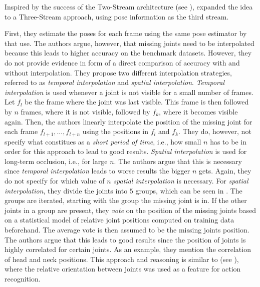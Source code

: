 Inspired by the success of the Two-Stream architecture (see ), \cite{khalid_multi-modal_2018} expanded the idea to a Three-Stream approach, using pose information as the third stream.

First, they estimate the poses for each frame using the same pose estimator by \cite{cao_realtime_2017} that \cite{choutas_potion:_2018} use.
The authors argue, however, that missing joints need to be interpolated because this leads to higher accuracy on the benchmark datasets.
However, they do not provide evidence in form of a direct comparison of accuracy with and without interpolation.
They propose two different interpolation strategies, referred to as \textit{temporal interpolation} and \textit{spatial interpolation}.
\textit{Temporal interpolation} is used whenever a joint is not visible for a small number of frames.
Let $f_l$ be the frame where the joint was last visible.
This frame is then followed by $n$ frames, where it is not visible, followed by $f_k$, where it becomes visible again.
Then, the authors linearly interpolate the position of the missing joint for each frame $f_{l+1}, \dots, f_{l+n}$ using the positions in $f_l$ and $f_k$.
They do, however, not specify what constitues as a \textit{short period of time}, i.e., how small $n$ has to be in order for this approach to lead to good results.
\textit{Spatial interpolation} is used for long-term occlusion, i.e., for large $n$.
The authors argue that this is necessary since \textit{temporal interpolation} leads to worse results the bigger $n$ gets.
Again, they do not specify for which value of $n$ \textit{spatial interpolation} is necessary.
For \textit{spatial interpolation}, they divide the joints into $5$ groups, which can be seen in .
The groups are iterated, starting with the group the missing joint is in.
If the other joints in a group are present, they \textit{vote} on the position of the missing joints based on a statistical model of relative joint positions computed on training data beforehand.
The average vote is then assumed to be the missing joints position.
The authors argue that this leads to good results since the position of joints is highly correlated for certain joints.
As an example, they mention the correlation of head and neck positions.
This approach and reasoning is similar to \cite{yang_articulated_2011} (see ), where the relative orientation between joints was used as a feature for action recognition.


